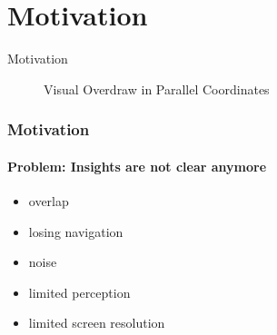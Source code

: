 \section{Motivation}


\begin{frame}{Motivation}
    \begin{figure}
        \centering
        \caption{Visual Overdraw in Parallel Coordinates}
        \label{fig:parallelcoordinates}
    \end{figure}
\end{frame}


\begin{frame}
	\frametitle{Motivation}
	\framesubtitle{Problem: Insights are not clear anymore}
	\begin{itemize}
	    \item overlap
	    \item losing navigation
	    \item noise
	    \item limited perception
	    \item limited screen resolution
	\end{itemize}
\end{frame}

